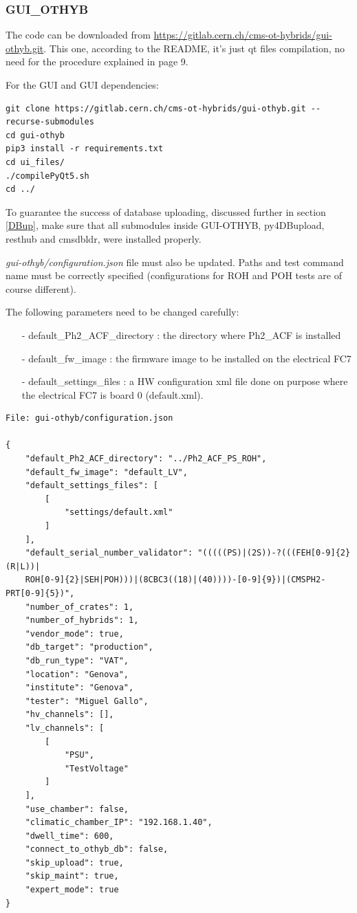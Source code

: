 \documentclass[10pt,a4paper]{article}
\begin{document}
\subsubsection{GUI\_OTHYB}
\label{gui}

The code can be downloaded from \url{https://gitlab.cern.ch/cms-ot-hybrids/gui-othyb.git}. This one, according to the README, it’s just qt files compilation, no need for the procedure explained in page 9.

For the GUI and GUI dependencies: 

\begin{framed}
\begin{verbatim}
git clone https://gitlab.cern.ch/cms-ot-hybrids/gui-othyb.git --recurse-submodules 
cd gui-othyb
pip3 install -r requirements.txt
cd ui_files/
./compilePyQt5.sh
cd ../

\end{verbatim}
\end{framed}

To guarantee the success of database uploading, discussed further in section \ref{DBup}, make sure that all submodules inside GUI-OTHYB, py4DBupload, resthub and cmsdbldr, were installed properly.

\emph{gui-othyb/configuration.json} file must also be updated. Paths and test command name must be correctly specified (configurations for ROH and POH tests are of course different).

The following parameters need to be changed carefully:
\begin{itemize}
\item[-] default\_Ph2\_ACF\_directory : the directory where Ph2\_ACF is installed
\item[-] default\_fw\_image : the firmware image to be installed on the electrical FC7
\item[-] default\_settings\_files : a HW configuration xml file done on purpose where the electrical FC7 is board 0 (default.xml). 
\end{itemize}

\begin{framed}
\begin{verbatim}
File: gui-othyb/configuration.json

{
    "default_Ph2_ACF_directory": "../Ph2_ACF_PS_ROH",
    "default_fw_image": "default_LV",
    "default_settings_files": [
        [
            "settings/default.xml"
        ]
    ],
    "default_serial_number_validator": "(((((PS)|(2S))-?(((FEH[0-9]{2}(R|L))|
    ROH[0-9]{2}|SEH|POH)))|(8CBC3((18)|(40))))-[0-9]{9})|(CMSPH2-PRT[0-9]{5})",
    "number_of_crates": 1,
    "number_of_hybrids": 1,
    "vendor_mode": true,
    "db_target": "production",
    "db_run_type": "VAT",
    "location": "Genova",
    "institute": "Genova",
    "tester": "Miguel Gallo",
    "hv_channels": [],
    "lv_channels": [
        [
            "PSU",
            "TestVoltage"
        ]
    ],
    "use_chamber": false,
    "climatic_chamber_IP": "192.168.1.40",
    "dwell_time": 600,
    "connect_to_othyb_db": false,
    "skip_upload": true,
    "skip_maint": true,
    "expert_mode": true
}

\end{verbatim}
\end{framed}
\end{document}
